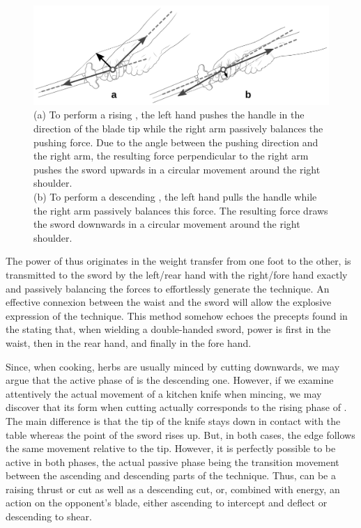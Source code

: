 \begin{figure}[ht]
	\centering
	
	\includegraphics[width=1.00\textwidth]{../../Images/JibenJianfa/Duo/../Duo/DuoDetail.pdf}
	\caption[Balance of forces in \Duo{}]{(a) To perform a rising \Duo{}, the left hand pushes the handle in the direction of the blade tip while the right arm passively balances the pushing force. Due to the angle between the pushing direction and the right arm, the resulting force perpendicular to the right arm pushes the sword upwards in a circular movement around the right shoulder.\\
	(b) To perform a descending \Duo{}, the left hand pulls the handle while the right arm passively balances this force. The resulting force draws the sword downwards in a circular movement around the right shoulder.
	}
	\label{fig:duo_detail}
\end{figure} 

The power of \Duo{} thus originates in the weight transfer from one foot to the other, is transmitted to the sword by the left/rear hand with the right/fore hand exactly and passively balancing the forces to effortlessly generate the technique. An effective connexion between the waist and the sword will allow the explosive expression of the \Duo{} technique. 
This method somehow echoes the precepts found in the \JianJing{} stating that, when wielding a double-handed sword, power is first in the waist, then in the rear hand, and finally in the fore hand.

Since, when cooking, herbs are usually minced by cutting downwards, we may argue that the active phase of \Duo{} is the descending one. However, if we examine attentively the actual movement of a kitchen knife when mincing, we may discover that its form when cutting actually corresponds to the rising phase of \Duo{}. The main difference is that the tip of the knife stays down in contact with the table whereas the point of the sword rises up. But, in both cases, the edge follows the same movement relative to the tip. 
However, it is perfectly possible to be active in both phases, the actual passive phase being the transition movement between the ascending and descending parts of the technique. Thus, \Duo{} can be a raising thrust or cut as well as a descending cut, or, combined with \Mo{} energy, an action on the opponent's blade, either ascending to intercept and deflect or descending to shear. 

